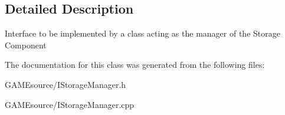 \subsection{Detailed Description}
Interface to be implemented by a class acting as the manager of the Storage Component 

The documentation for this class was generated from the following files\+:\begin{DoxyCompactItemize}
\item 
G\+A\+M\+Esource/I\+Storage\+Manager.\+h\item 
G\+A\+M\+Esource/I\+Storage\+Manager.\+cpp\end{DoxyCompactItemize}
